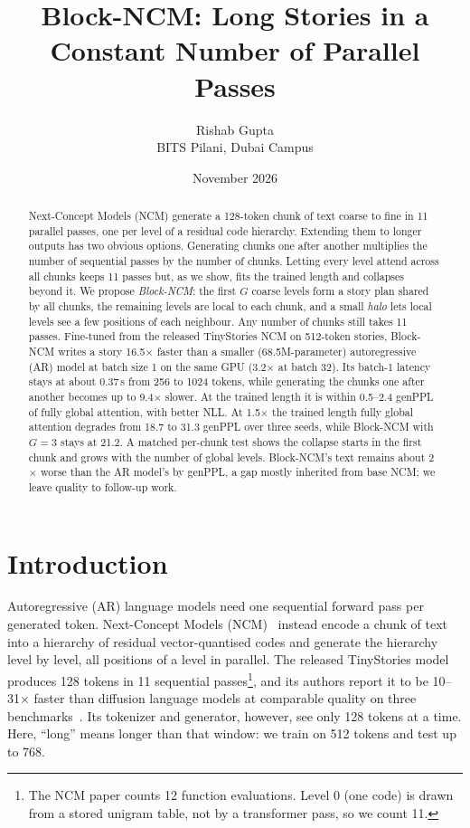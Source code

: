 \documentclass[10pt,twocolumn]{article}
\title{\textbf{Block-NCM: Long Stories in a Constant Number of Parallel Passes}}
\author{Rishab Gupta\\ \small BITS Pilani, Dubai Campus}
\date{November 2026}
\begin{document}
\maketitle

\begin{abstract}
Next-Concept Models (NCM) generate a 128-token chunk of text coarse to fine in 11 parallel passes, one per level of
a residual code hierarchy. Extending them to longer outputs has two obvious options. Generating chunks one after
another multiplies the number of sequential passes by the number of chunks. Letting every level attend across all
chunks keeps 11 passes but, as we show, fits the trained length and collapses beyond it. We propose
\emph{Block-NCM}: the first $G$ coarse levels form a story plan shared by all chunks, the remaining levels are
local to each chunk, and a small \emph{halo} lets local levels see a few positions of each neighbour. Any number of
chunks still takes 11 passes. Fine-tuned from the released TinyStories NCM on 512-token stories, Block-NCM writes a
story 16.5$\times$ faster than a smaller (68.5M-parameter) autoregressive (AR) model at batch size 1 on the same GPU
(3.2$\times$ at batch 32). Its batch-1 latency stays at about 0.37\,s from 256 to 1024 tokens, while generating the
chunks one after another becomes up to 9.4$\times$ slower. At the trained length it is within 0.5--2.4 genPPL of fully global attention, with
better NLL. At 1.5$\times$ the trained length fully global attention degrades from 18.7 to 31.3 genPPL over three
seeds, while Block-NCM with $G{=}3$ stays at 21.2. A matched per-chunk test shows the collapse starts in the first
chunk and grows with the number of global levels. Block-NCM's text remains about 2$\times$ worse than the AR model's
by genPPL, a gap mostly inherited from base NCM; we leave quality to follow-up work.
\end{abstract}

\section{Introduction}

Autoregressive (AR) language models need one sequential forward pass per generated token. Next-Concept Models
(NCM)~\cite{ncm} instead encode a chunk of text into a hierarchy of residual vector-quantised codes and generate the
hierarchy level by level, all positions of a level in parallel. The released TinyStories model produces 128 tokens
in 11 sequential passes\footnote{The NCM paper counts 12 function evaluations. Level 0 (one code) is drawn from a
stored unigram table, not by a transformer pass, so we count 11.}, and its authors report it to be 10--31$\times$
faster than diffusion language models at comparable quality on three benchmarks~\cite{ncm}. Its tokenizer and
generator, however, see only 128 tokens at a time. Here, ``long'' means longer than that window: we train on 512
tokens and test up to 768.
\end{document}
